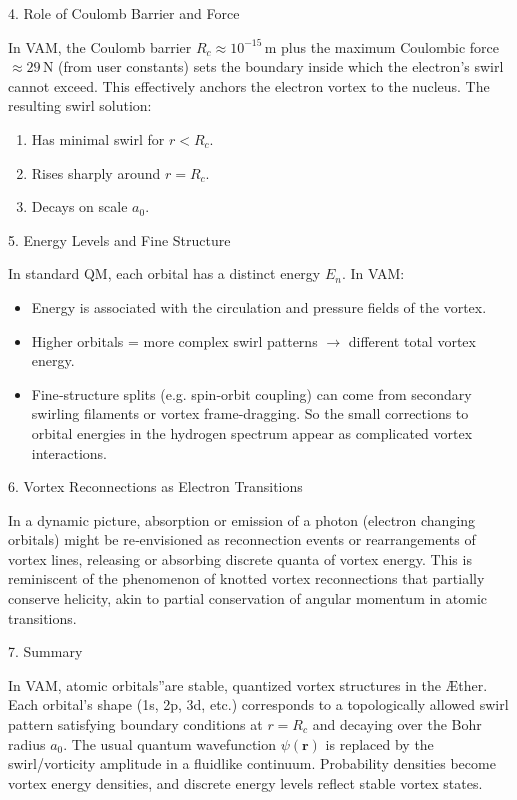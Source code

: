 4. Role of Coulomb Barrier and Force

In VAM, the Coulomb barrier \(R_c \approx 10^{-15}\,\mathrm{m}\) plus the maximum Coulombic force \(\approx 29\,\mathrm{N}\) (from user constants) sets the boundary inside which the electron's swirl cannot exceed. This effectively anchors the electron vortex to the nucleus. The resulting swirl solution:

\begin{enumerate}
\item Has minimal swirl for \(r < R_c\).
\item Rises sharply around \(r = R_c\).
\item Decays on scale \(a_0\).
\end{enumerate}

5. Energy Levels and Fine Structure

In standard QM, each orbital has a distinct energy \(E_n\). In VAM:

\begin{itemize}
\item Energy is associated with the circulation and pressure fields of the vortex.
\item Higher orbitals = more complex swirl patterns \(\rightarrow\) different total vortex energy.
\item Fine‐structure splits (e.g. spin‐orbit coupling) can come from secondary swirling filaments or vortex frame‐dragging. So the small corrections to orbital energies in the hydrogen spectrum appear as complicated vortex interactions.
\end{itemize}

6. Vortex Reconnections as Electron Transitions

In a dynamic picture, absorption or emission of a photon (electron changing orbitals) might be re‐envisioned as reconnection events or rearrangements of vortex lines, releasing or absorbing discrete quanta of vortex energy. This is reminiscent of the phenomenon of knotted vortex reconnections that partially conserve helicity, akin to partial conservation of angular momentum in atomic transitions.

7. Summary

In VAM, \grqq atomic orbitals\textquotedblright are stable, quantized vortex structures in the Æther. Each orbital's shape (1s, 2p, 3d, etc.) corresponds to a topologically allowed swirl pattern satisfying boundary conditions at \(r = R_c\) and decaying over the Bohr radius \(a_0\). The usual quantum wavefunction \(\psi(\mathbf{r})\) is replaced by the swirl/vorticity amplitude in a fluidlike continuum. Probability densities become vortex energy densities, and discrete energy levels reflect stable vortex states.


